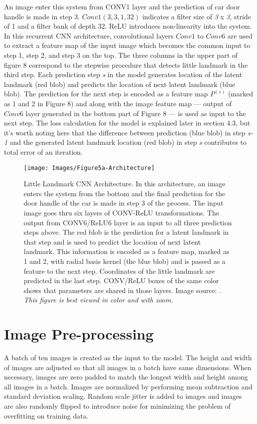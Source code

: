 \documentclass [11pt,letterpaper ,openany ]{report}
\begin{document}
    An image enter this system from CONV1 layer and the prediction of car door handle is made in step 3. \(Conv1(3,3,1,32) \) indicates a filter size of \textit{3} x \textit{3}, stride of 1 and a filter bank of depth 32. ReLU introduces non-linearity into the system. In this recurrent CNN architecture, convolutional layers \(Conv1\) to \(Conv6\) are used to extract a feature map of the input image which becomes the common input to step 1, step 2, and step 3 on the top. The three columns in the upper part of figure 8 correspond to the stepwise procedure that detects little landmark in the third step. Each prediction step \textit{s} in the model generates location of the latent landmark (red blob) and predicts the location of next latent landmark (blue blob). The prediction for the next step is encoded as a feature map \(P^{(s)}\) (marked as 1 and 2 in Figure 8) and along with the image feature map --- output of \(Conv6\) layer generated in the bottom part of Figure 8 --- is used as input to the next step. The loss calculation for the model is explained later in section 4.3, but it's worth noting here that the difference between prediction (blue blob) in step \textit {s-1} and the generated latent landmark location (red blob) in step \textit {s} contributes to total error of an iteration.

    \begin{figure}[t!]
      \centering
      \texttt{[image: Images/Figure5a-Architecture]}
      \caption{Little Landmark CNN Architecture. In this architecture, an image enters the system from the bottom and the final prediction for the door handle of the car is made in step 3 of the process. The input image goes thru six layers of CONV-ReLU transformations. The output from CONV6/ReLU6 layer is an input to all three prediction steps above. The red blob is the prediction for a latent landmark in that step and is used to predict the location of next latent landmark. This information is encoded as a feature map, marked as 1 and 2, with radial basis kernel (the blue blob) and is passed as a feature to the next step. Coordinates of the little landmark are predicted in the last step. CONV/ReLU boxes of the same color shows that parameters are shared in those layers. Image source: \cite{Singh_2016_CVPR}. \textit{This figure is best viewed in color and with zoom.}}
      \label{fig:arch}
    \end{figure}            

    \section{Image Pre-processing}
    A batch of ten images is created as the input to the model. The height and width of images are adjusted so that all images in a batch have same dimensions. When necessary, images are zero padded to match the longest width and height among all images in a batch. Images are normalized by performing mean subtraction and standard deviation scaling. Random scale jitter is added to images and images are also randomly flipped to introduce noise for minimizing the problem of overfitting on training data.
\end{document}

